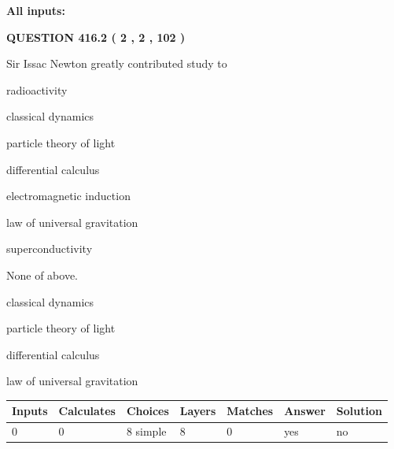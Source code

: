 \documentclass[12pt]{article}
\begin{document}
   
   
   
\noindent{}
   
   
   
   
\noindent\vspace{0.1in}\hspace{-0.08in} {\textbf{\Large{All inputs: }}}
   
   
  
\vspace{0.2in}
  
{\textbf{\Large{QUESTION
416.2 
 ( 2 , 2 , 102 )
}}}
  
  
Sir Issac Newton greatly contributed study to
 
 
radioactivity
 
 
classical dynamics
 
 
particle theory of light
 
 
differential calculus
 
 
electromagnetic induction
 
 
law of universal gravitation
 
 
superconductivity
 
 
 None of above.
 
 
\noindent{}
 
 
classical dynamics
 
 
particle theory of light
 
 
differential calculus
 
 
law of universal gravitation
 
 
\noindent{}
 
 
   
   
   
   
\noindent\begin{tabular}{|l|l|l|l|l|l|l|}
 \hline
Inputs & Calculates & Choices & Layers & Matches & Answer & Solution \\ \hline
 0  & 
 0  & 
 8
  simple  
  & 
 8  & 
 0  & 
  yes & 
  no 
  \\ \hline
 \end{tabular}
   
\end{document}
